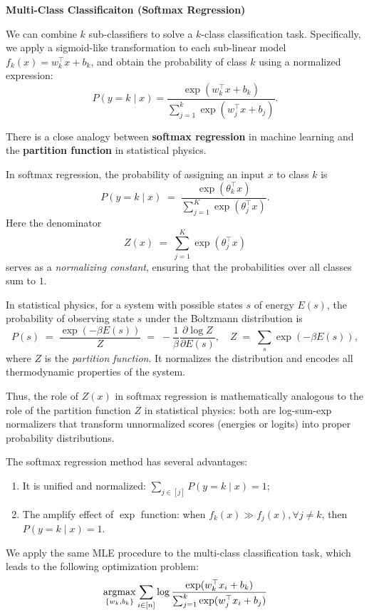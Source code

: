 \documentclass[../main]{subfiles}
\begin{document}
\begin{example}
  \textbf{Multi-Class Classificaiton (Softmax Regression)}
\end{example}
We can combine $k$ sub-classifiers to solve a $k$-class classification task. 
Specifically, we apply a sigmoid-like transformation to each sub-linear model 
$f_k(x) = w_k^\top x + b_k$, and obtain the probability of class $k$ using a normalized expression:
\begin{equation}
    P(y = k \mid x) 
    = \frac{\exp(w_k^\top x + b_k)}{\sum_{j=1}^{k} \exp(w_j^\top x + b_j)}.
\end{equation}
\begin{note}
  There is a close analogy between \textbf{softmax regression} in machine learning and the \textbf{partition function} in statistical physics.

  In softmax regression, the probability of assigning an input $x$ to class $k$ is
  \begin{equation}
    P(y=k \mid x) \;=\; \frac{\exp(\theta_k^\top x)}{\sum_{j=1}^K \exp(\theta_j^\top x)} .
  \end{equation}
  Here the denominator
  \begin{equation}
    Z(x) \;=\; \sum_{j=1}^K \exp(\theta_j^\top x)
  \end{equation}
  serves as a \emph{normalizing constant}, ensuring that the probabilities over all classes sum to $1$.

  In statistical physics, for a system with possible states $s$ of energy $E(s)$, the probability of observing state $s$ under the Boltzmann distribution is
  \begin{equation}
    P(s) \;=\; \frac{\exp(-\beta E(s))}{Z}\;=\;-\frac{1}{\beta}\frac{\partial \log Z}{\partial E(s)}, 
    \quad Z \;=\; \sum_{s} \exp(-\beta E(s)) ,
  \end{equation}
  where $Z$ is the \emph{partition function}. It normalizes the distribution and encodes all thermodynamic properties of the system.

  Thus, the role of $Z(x)$ in softmax regression is mathematically analogous to the role of the partition function $Z$ in statistical physics: both are log-sum-exp normalizers that transform unnormalized scores (energies or logits) into proper probability distributions.
\end{note}
\vspace{1em}
The softmax regression method has several advantages:
\begin{enumerate}
  \item It is unified and normalized: $\sum_{j\in[j]}P(y=k\mid x)=1$;
  \item The amplify effect of $\exp$ function: when $f_k(x)\gg f_j(x),\forall j\neq k$, then $P(y=k\mid x)=1$.
\end{enumerate}
We apply the same MLE procedure to the multi-class classification task, 
which leads to the following optimization problem:
\begin{equation}
    \mathop{\mathrm{argmax}}_{\{w_k,b_k\}} \sum_{i\in[n]} 
    \log \frac{\exp(w_k^\top x_i + b_k)}{\sum_{j=1}^{k} \exp(w_j^\top x_i + b_j)}
\end{equation}
\end{document}
